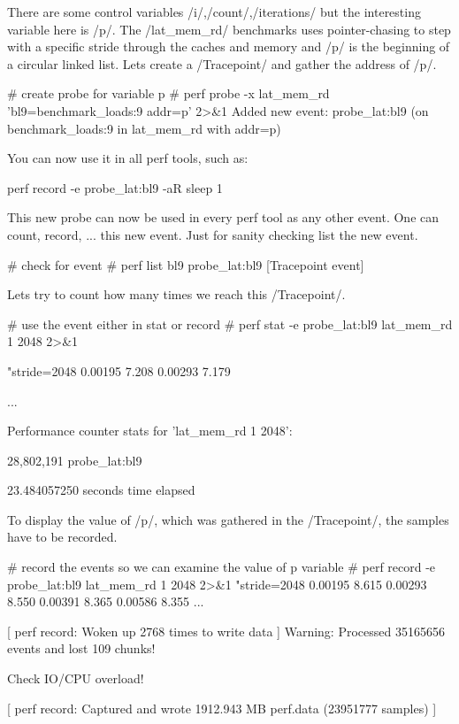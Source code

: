 There are some control variables /i/,/count/,/iterations/ but the interesting
variable here is /p/. The /lat_mem_rd/ benchmarks uses pointer-chasing to step
with a specific stride through the caches and memory and /p/ is the beginning
of a circular linked list. Lets create a /Tracepoint/ and gather the
address of /p/.

\starttyping
# create probe for variable p
# perf probe -x lat_mem_rd 'bl9=benchmark_loads:9 addr=p' 2>&1
Added new event:
  probe_lat:bl9        (on benchmark_loads:9 in lat_mem_rd with addr=p)

You can now use it in all perf tools, such as:

	perf record -e probe_lat:bl9 -aR sleep 1

\stoptyping

This new probe can now be used in every perf tool as any other
event. One can count, record, ... this new event. Just for sanity
checking list the new event.

\starttyping
# check for event
# perf list bl9
probe_lat:bl9                                      [Tracepoint event]
\stoptyping

Lets try to count how many times we reach this /Tracepoint/.

\starttyping
# use the event either in stat or record
# perf stat -e probe_lat:bl9 lat_mem_rd 1 2048 2>&1

"stride=2048
0.00195 7.208
0.00293 7.179

    ...

 Performance counter stats for 'lat_mem_rd 1 2048':

        28,802,191      probe_lat:bl9

      23.484057250 seconds time elapsed

\stoptyping

To display the value of /p/, which was gathered in the /Tracepoint/,
the samples have to be recorded.

\starttyping
# record the events so we can examine the value of p variable
# perf record -e probe_lat:bl9 lat_mem_rd 1 2048 2>&1
"stride=2048
0.00195 8.615
0.00293 8.550
0.00391 8.365
0.00586 8.355
     ...

[ perf record: Woken up 2768 times to write data ]
Warning:
Processed 35165656 events and lost 109 chunks!

Check IO/CPU overload!

[ perf record: Captured and wrote 1912.943 MB perf.data (23951777 samples) ]
\stoptyping

